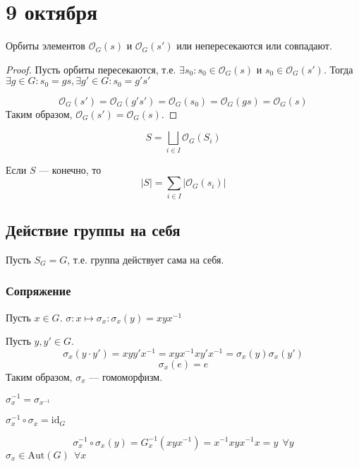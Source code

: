 \chapter{9 октября}

\begin{lemma}
    Орбиты элементов \(\mathcal{O}_G(s)\) и \(\mathcal{O}_G(s')\) или непересекаются или совпадают.
\end{lemma}
\begin{proof}
    Пусть орбиты пересекаются, т.е. \(\exists s_0 : s_0 \in \mathcal{O}_G(s)\) и \(s_0 \in \mathcal{O}_G(s')\). Тогда \(\exists g \in G : s_0 = gs, \exists g' \in G : s_0 = g's'\)

    \[\mathcal{O}_G(s') = \mathcal{O}_G(g's') = \mathcal{O}_G(s_0) = \mathcal{O}_G(gs) = \mathcal{O}_G(s)\]
    Таким образом, \(\mathcal{O}_G(s') = \mathcal{O}_G(s)\).
\end{proof}

\begin{remark}
    \[S = \bigsqcup_{i \in I} \mathcal{O}_G(S_i)\]
\end{remark}

\begin{remark}
    Если \(S\) --- конечно, то
    \[|S|= \sum_{i \in I} |\mathcal{O}_G(s_i)|\]
\end{remark}

\section{Действие группы на себя}

Пусть \(S_G = G\), т.е. группа действует сама на себя.

\subsection{Сопряжение}

Пусть \(x \in G\). \(\sigma : x \mapsto \sigma_x : \sigma_x(y) = xyx^{-1}\)

Пусть \(y, y' \in G\).
\[\sigma_x(y \cdot y') = x yy' x^{-1} = xyx^{-1}xy'x^{-1} = \sigma_x(y)\sigma_x(y')\]
\[\sigma_x(e) = e\]
Таким образом, \(\sigma_x\) --- гомоморфизм.

\(\sigma_x^{-1} = \sigma_{x^{-1}}\)

\(\sigma_x^{-1} \circ \sigma_x = \mathrm{id}_G\)

\[\sigma_x^{-1} \circ \sigma_x(y) = G_x^{-1}(xyx^{-1}) = x^{-1}xyx^{-1}x = y \ \ \forall y\]
\(\sigma_x \in \mathrm{Aut}(G) \ \ \forall x\)

